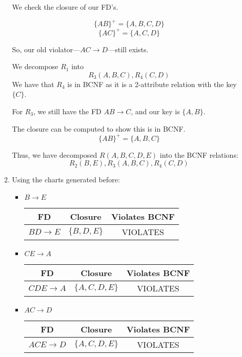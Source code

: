\documentclass[12pt,letterpaper]{article}
\newcommand{\closure}[1]{\{#1\}^+}
\begin{document}
\begin{enumerate}
\begin{enumerate}
          We check the closure of our FD's.

          \[\closure{AB} = \{A, B, C, D\}\]
          \[\closure{AC} = \{A, C, D\}\]

          So, our old violator---$AC \rightarrow D$---still exists.

          We decompose $R_1$ into
          \[R_3(A, B, C), R_4(C, D)\]
          We have that $R_4$ is in BCNF as it is a 2-attribute relation with the key $\{C\}$.

          For $R_3$, we still have the FD $AB \rightarrow C$, and our key is $\{A, B\}$.

          The closure can be computed to show this is in BCNF.
          \[\closure{AB} = \{A, B, C\}\]

          Thus, we have decomposed $R(A, B, C, D, E)$ into the BCNF relations:
          \[R_2(B, E), R_3(A, B, C), R_4(C, D)\]

        \item
          Using the charts generated before:

          \begin{itemize}
            \item $B \rightarrow E$

              \begin{tabular}{c | c | c |}
                FD                    & Closure             & Violates BCNF \\
                \hline
                $BD \rightarrow E$    & $\{B, D, E\}$       & VIOLATES \\
                \hline
              \end{tabular}

            \item $CE \rightarrow A$

              \begin{tabular}{c | c | c |}
                FD                    & Closure             & Violates BCNF \\
                \hline
                $CDE \rightarrow A$   & $\{A, C, D, E\}$    & VIOLATES \\
                \hline
              \end{tabular}

            \item $AC \rightarrow D$

              \begin{tabular}{c | c | c |}
                FD                    & Closure             & Violates BCNF \\
                \hline
                $ACE \rightarrow D$   & $\{A, C, D, E\}$    & VIOLATES \\
                \hline
              \end{tabular}
          \end{itemize}


\end{enumerate}
\end{enumerate}
\end{document}
